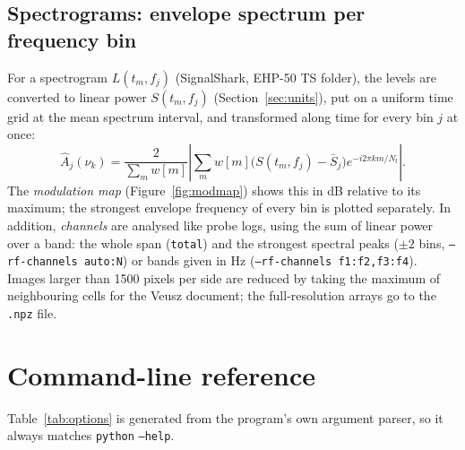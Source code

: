 \documentclass[10pt,letterpaper]{article}
\numberwithin{equation}{section}
\begin{document}
\subsection{Spectrograms: envelope spectrum per frequency bin}\label{sec:spectrogram}
For a spectrogram $L(t_m, f_j)$ (SignalShark, EHP-50 TS folder), the levels are
converted to linear power $S(t_m, f_j)$ (Section~\ref{sec:units}), put on a
uniform time grid at the mean spectrum interval, and transformed along time for
every bin $j$ at once:
\begin{equation}
\hat{A}_j(\nu_k) = \frac{2}{\sum_m w[m]}\left|\sum_m w[m]\big(S(t_m,f_j) - \bar{S}_j\big)e^{-i2\pi km/N_t}\right| .
\end{equation}
The \emph{modulation map} (Figure~\ref{fig:modmap}) shows this in dB relative to
its maximum; the strongest envelope frequency of every bin is plotted
separately. In addition, \emph{channels} are analysed like probe logs, using the
sum of linear power over a band: the whole span (\texttt{total}) and the
strongest spectral peaks ($\pm2$ bins, \texttt{--rf-channels auto:N}) or bands
given in Hz (\texttt{--rf-channels f1:f2,f3:f4}). Images larger than
1500 pixels per side are reduced by taking the maximum of neighbouring
cells for the Veusz document; the full-resolution arrays go to the
\texttt{.npz} file.

\section{Command-line reference}\label{sec:cli}
Table~\ref{tab:options} is generated from the program's own argument parser,
so it always matches \texttt{python}  \texttt{--help}.
\end{document}
